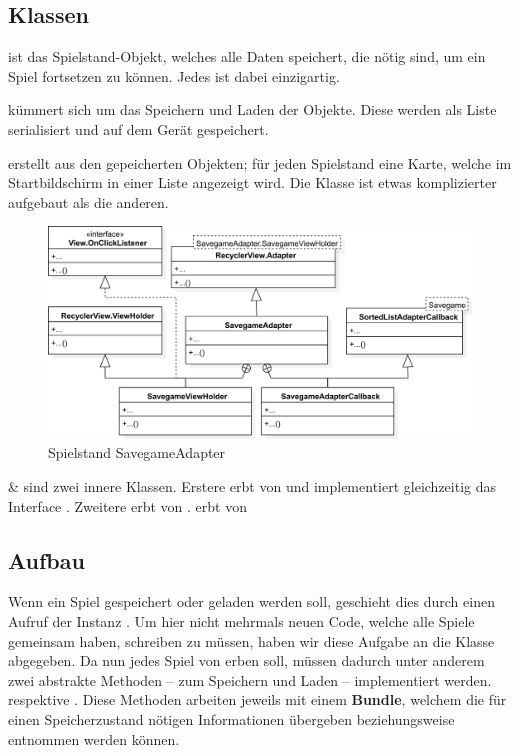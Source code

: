 \subsection{Klassen}

 ist das Spielstand-Objekt, welches alle Daten speichert, die
nötig sind, um ein Spiel fortsetzen zu können. Jedes  ist dabei
einzigartig.

 kümmert sich um das Speichern und Laden der
 Objekte. Diese werden als Liste serialisiert und auf dem Gerät
gespeichert.

 erstellt aus den gepeicherten  Objekten;
für jeden Spielstand eine Karte, welche im Startbildschirm in einer Liste
angezeigt wird. Die Klasse ist etwas komplizierter aufgebaut als die anderen.

\begin{figure}[h]
	\centering
	\includegraphics[width=1.0\textwidth]{resources/savegamestorage/SavegameAdapter}
	\caption{Spielstand SavegameAdapter}
\end{figure}

 \&  sind zwei innere
Klassen. Erstere erbt von  und implementiert
gleichzeitig das Interface . Zweitere erbt von
.  erbt von

\subsection{Aufbau}
\subsectionauthor{\frank}

Wenn ein Spiel gespeichert oder geladen werden soll, geschieht dies durch einen
Aufruf der Instanz . Um hier nicht mehrmals neuen Code,
welche alle Spiele gemeinsam haben, schreiben zu müssen, haben wir diese
Aufgabe an die Klasse  abgegeben. Da nun jedes Spiel von
 erben soll, müssen dadurch unter anderem zwei abstrakte
Methoden -- zum Speichern und Laden -- implementiert werden.
 respektive . Diese Methoden
arbeiten jeweils mit einem \textbf{Bundle}, welchem die für einen
Speicherzustand nötigen Informationen übergeben beziehungsweise entnommen
werden können.

